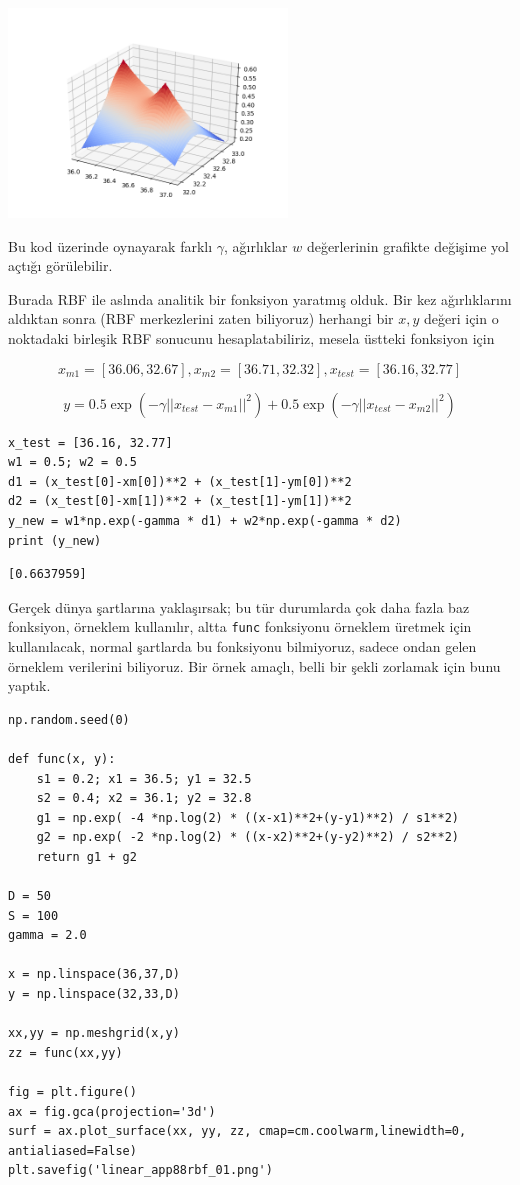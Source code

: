 \documentclass[12pt,fleqn]{article}\usepackage{../../common}
\begin{document}
\includegraphics[width=20em]{linear_app88rbf_04.png}

Bu kod üzerinde oynayarak farklı $\gamma$, ağırlıklar $w$ değerlerinin
grafikte değişime yol açtığı görülebilir. 

Burada RBF ile aslında analitik bir fonksiyon yaratmış olduk. Bir kez
ağırlıklarını aldıktan sonra (RBF merkezlerini zaten biliyoruz) herhangi
bir $x,y$ değeri için o noktadaki birleşik RBF sonucunu hesaplatabiliriz,
mesela üstteki fonksiyon için

$$
x_{m1} = [36.06, 32.67],
x_{m2} = [36.71, 32.32], 
x_{test} = [36.16, 32.77]
$$


$$
y = 0.5 \exp (-\gamma || x_{test} - x_{m1} ||^2) + 0.5 \exp (-\gamma || x_{test} - x_{m2} ||^2 )
$$

\begin{verbatim}
x_test = [36.16, 32.77]
w1 = 0.5; w2 = 0.5
d1 = (x_test[0]-xm[0])**2 + (x_test[1]-ym[0])**2
d2 = (x_test[0]-xm[1])**2 + (x_test[1]-ym[1])**2
y_new = w1*np.exp(-gamma * d1) + w2*np.exp(-gamma * d2) 
print (y_new)
\end{verbatim}

\begin{verbatim}
[0.6637959]
\end{verbatim}

Gerçek dünya şartlarına yaklaşırsak; bu tür durumlarda çok daha fazla baz
fonksiyon, örneklem kullanılır, altta \verb!func! fonksiyonu örneklem
üretmek için kullanılacak, normal şartlarda bu fonksiyonu bilmiyoruz,
sadece ondan gelen örneklem verilerini biliyoruz. Bir örnek amaçlı, belli
bir şekli zorlamak için bunu yaptık.

\begin{verbatim}
np.random.seed(0)

def func(x, y):
    s1 = 0.2; x1 = 36.5; y1 = 32.5
    s2 = 0.4; x2 = 36.1; y2 = 32.8
    g1 = np.exp( -4 *np.log(2) * ((x-x1)**2+(y-y1)**2) / s1**2)
    g2 = np.exp( -2 *np.log(2) * ((x-x2)**2+(y-y2)**2) / s2**2)    
    return g1 + g2 

D = 50
S = 100
gamma = 2.0

x = np.linspace(36,37,D)
y = np.linspace(32,33,D)

xx,yy = np.meshgrid(x,y)
zz = func(xx,yy)

fig = plt.figure()
ax = fig.gca(projection='3d')
surf = ax.plot_surface(xx, yy, zz, cmap=cm.coolwarm,linewidth=0, antialiased=False)
plt.savefig('linear_app88rbf_01.png')
\end{verbatim}
\end{document}
